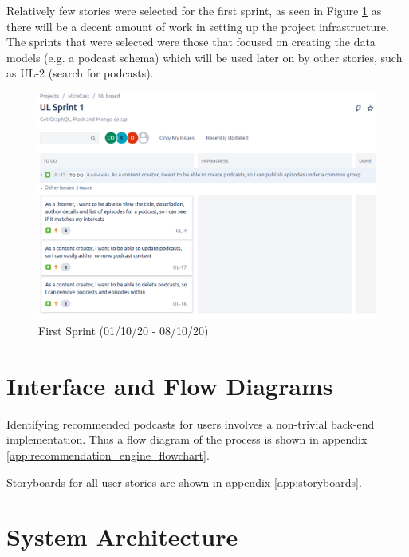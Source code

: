 \documentclass[12pt]{article}
\begin{document}
Relatively few stories were selected for the first sprint, as seen in Figure \ref{fig:first_sprint}
as there will be a decent amount of work in setting up the project infrastructure. 
The sprints that were selected were those that focused on creating the data models 
(e.g. a podcast schema) which will be used later on by other stories, such as UL-2 
(search for podcasts).

\begin{figure}[h]
    \centering
    \includegraphics[width=\textwidth]{resources/sprint1}
    \caption{First Sprint (01/10/20 - 08/10/20)}
    \label{fig:first_sprint}
\end{figure}

\newpage
\section{Interface and Flow Diagrams}

Identifying recommended podcasts for users involves a non-trivial back-end implementation. Thus a flow diagram of the process is shown in appendix \ref{app:recommendation_engine_flowchart}.

Storyboards for all user stories are shown in appendix \ref{app:storyboards}.


\section{System Architecture}
\end{document}
